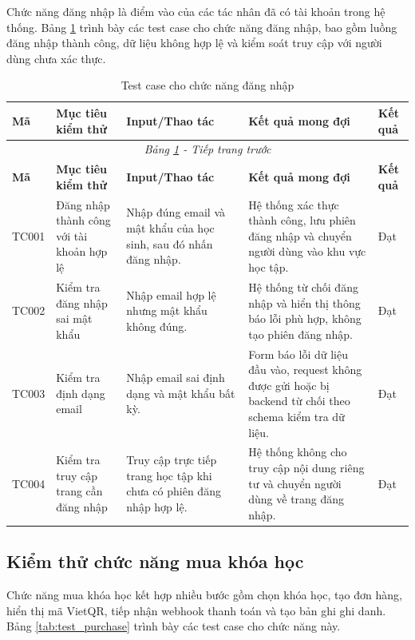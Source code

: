 \documentclass[../DoAn.tex]{subfiles}
\begin{document}
Chức năng đăng nhập là điểm vào của các tác nhân đã có tài khoản trong hệ thống. Bảng \ref{tab:test_login} trình bày các test case cho chức năng đăng nhập, bao gồm luồng đăng nhập thành công, dữ liệu không hợp lệ và kiểm soát truy cập với người dùng chưa xác thực.

\small
\setlength{\tabcolsep}{3pt}
\renewcommand{\arraystretch}{1.25}
\begin{longtable}{|p{}|p{}|p{}|p{}|p{}|}
\caption{Test case cho chức năng đăng nhập}
\label{tab:test_login}\\
\hline
\textbf{Mã} & \textbf{Mục tiêu kiểm thử} & \textbf{Input/Thao tác} & \textbf{Kết quả mong đợi} & \textbf{Kết quả} \\ \hline
\endfirsthead
\multicolumn{5}{c}{\textit{Bảng \ref{tab:test_login} - Tiếp trang trước}}\\
\hline
\textbf{Mã} & \textbf{Mục tiêu kiểm thử} & \textbf{Input/Thao tác} & \textbf{Kết quả mong đợi} & \textbf{Kết quả} \\ \hline
\endhead
TC001 & Đăng nhập thành công với tài khoản hợp lệ & Nhập đúng email và mật khẩu của học sinh, sau đó nhấn đăng nhập. & Hệ thống xác thực thành công, lưu phiên đăng nhập và chuyển người dùng vào khu vực học tập. & Đạt \\ \hline
TC002 & Kiểm tra đăng nhập sai mật khẩu & Nhập email hợp lệ nhưng mật khẩu không đúng. & Hệ thống từ chối đăng nhập và hiển thị thông báo lỗi phù hợp, không tạo phiên đăng nhập. & Đạt \\ \hline
TC003 & Kiểm tra định dạng email & Nhập email sai định dạng và mật khẩu bất kỳ. & Form báo lỗi dữ liệu đầu vào, request không được gửi hoặc bị backend từ chối theo schema kiểm tra dữ liệu. & Đạt \\ \hline
TC004 & Kiểm tra truy cập trang cần đăng nhập & Truy cập trực tiếp trang học tập khi chưa có phiên đăng nhập hợp lệ. & Hệ thống không cho truy cập nội dung riêng tư và chuyển người dùng về trang đăng nhập. & Đạt \\ \hline
\end{longtable}
\normalsize

\subsection{Kiểm thử chức năng mua khóa học}

Chức năng mua khóa học kết hợp nhiều bước gồm chọn khóa học, tạo đơn hàng, hiển thị mã VietQR, tiếp nhận webhook thanh toán và tạo bản ghi ghi danh. Bảng \ref{tab:test_purchase} trình bày các test case cho chức năng này.
\end{document}
